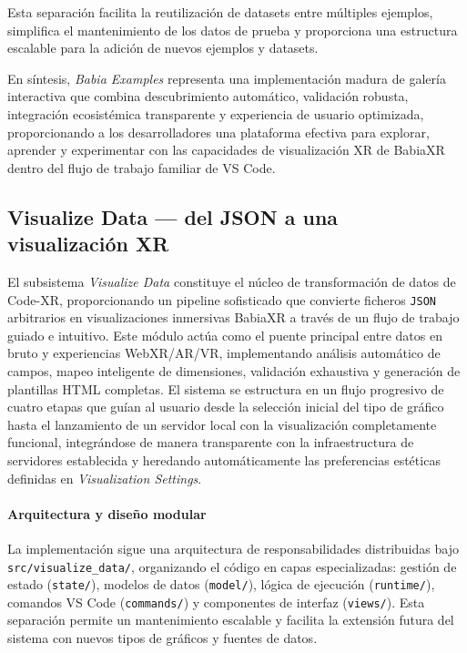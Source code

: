 \documentclass[a4paper, 12pt]{book}
\begin{document}
Esta separación facilita la reutilización de datasets entre múltiples ejemplos, simplifica el mantenimiento de los datos de prueba y proporciona una estructura escalable para la adición de nuevos ejemplos y datasets.


En síntesis, \emph{Babia Examples} representa una implementación madura de galería interactiva que combina descubrimiento automático, validación robusta, integración ecosistémica transparente y experiencia de usuario optimizada, proporcionando a los desarrolladores una plataforma efectiva para explorar, aprender y experimentar con las capacidades de visualización XR de BabiaXR dentro del flujo de trabajo familiar de VS Code.


\subsection{Visualize Data — del JSON a una visualización XR}
\label{sec:visualize-data}

El subsistema \emph{Visualize Data} constituye el núcleo de transformación de datos de Code-XR, proporcionando un pipeline sofisticado que convierte ficheros \texttt{JSON} arbitrarios en visualizaciones inmersivas BabiaXR a través de un flujo de trabajo guiado e intuitivo. Este módulo actúa como el puente principal entre datos en bruto y experiencias WebXR/AR/VR, implementando análisis automático de campos, mapeo inteligente de dimensiones, validación exhaustiva y generación de plantillas HTML completas. 
El sistema se estructura en un flujo progresivo de cuatro etapas que guían al usuario desde la selección inicial del tipo de gráfico hasta el lanzamiento de un servidor local con la visualización completamente funcional, integrándose de manera transparente con la infraestructura de servidores establecida y heredando automáticamente las preferencias estéticas definidas en \emph{Visualization Settings}.

\paragraph{Arquitectura y diseño modular}
La implementación sigue una arquitectura de responsabilidades distribuidas bajo \texttt{src/visualize\_data/}, organizando el código en capas especializadas: gestión de estado (\texttt{state/}), modelos de datos (\texttt{model/}), lógica de ejecución (\texttt{runtime/}), comandos VS Code (\texttt{commands/}) y componentes de interfaz (\texttt{views/}). Esta separación permite un mantenimiento escalable y facilita la extensión futura del sistema con nuevos tipos de gráficos y fuentes de datos.
\end{document}
